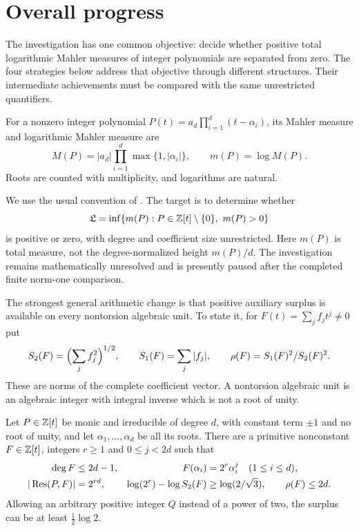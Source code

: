 \section{Overall progress}\label{sec:scope}

The investigation has one common objective: decide whether positive total logarithmic Mahler measures of integer polynomials are separated from zero.
The four strategies below address that objective through different structures.
Their intermediate achievements must be compared with the same unrestricted quantifiers.

\begin{definition}\label{sec:formulations}
For a nonzero integer polynomial $P(t)=a_d\prod_{i=1}^d(t-\alpha_i)$, its Mahler measure and logarithmic Mahler measure are
\begin{equation}\label{fo:mahler}
 M(P)=|a_d|\prod_{i=1}^d\max\{1,|\alpha_i|\},\qquad m(P)=\log M(P).
\end{equation}
Roots are counted with multiplicity, and logarithms are natural.
\end{definition}
We use the usual convention of \citet[\S1]{Smy08}.
The target is to determine whether
\begin{equation}\label{fo:gap}
 \mathfrak L=\inf\{m(P):P\in\mathbb Z[t]\setminus\{0\},\ m(P)>0\}
\end{equation}
is positive or zero, with degree and coefficient size unrestricted.
Here $m(P)$ is total measure, not the degree-normalized height $m(P)/d$.
The investigation remains mathematically unresolved and is presently paused after the completed finite norm-one comparison.

The strongest general arithmetic change is that positive auxiliary surplus is available on every nontorsion algebraic unit.
To state it, for $F(t)=\sum_jf_jt^j\ne0$ put
\[
 S_2(F)=\Bigl(\sum_jf_j^2\Bigr)^{1/2},\qquad
 S_1(F)=\sum_j|f_j|,\qquad \rho(F)=S_1(F)^2/S_2(F)^2.
\]
These are norms of the complete coefficient vector.
A nontorsion algebraic unit is an algebraic integer with integral inverse which is not a root of unity.

\begin{theorem}\label{ar:uniform-auxiliary}
Let $P\in\mathbb Z[t]$ be monic and irreducible of degree $d$, with constant term $\pm1$ and no root of unity, and let $\alpha_1,\ldots,\alpha_d$ be all its roots.
There are a primitive nonconstant $F\in\mathbb Z[t]$, integers $r\ge1$ and $0\le j<2d$ such that
\begin{align}
 \deg F&\le2d-1,&
 F(\alpha_i)&=2^r\alpha_i^j\quad(1\le i\le d),\notag\\
 |\operatorname{Res}(P,F)|&=2^{rd},&
 \log(2^r)-\log S_2(F)&\ge\log(2/\sqrt3),\qquad \rho(F)\le2d.
 \label{ar:dyadic-output}
\end{align}
Allowing an arbitrary positive integer $Q$ instead of a power of two, the surplus can be at least $\frac12\log2$.
\end{theorem}

